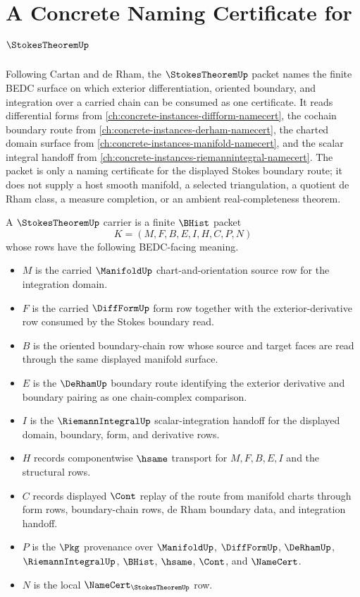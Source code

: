 \chapter{A Concrete Naming Certificate for $\StokesTheoremUp$}
\label{ch:concrete-instances-stokes-theorem-namecert}

Following Cartan and de Rham, the $\StokesTheoremUp$ packet names the finite BEDC surface on which exterior differentiation, oriented boundary, and integration over a carried chain can be consumed as one certificate. It reads differential forms from \autoref{ch:concrete-instances-diffform-namecert}, the cochain boundary route from \autoref{ch:concrete-instances-derham-namecert}, the charted domain surface from \autoref{ch:concrete-instances-manifold-namecert}, and the scalar integral handoff from \autoref{ch:concrete-instances-riemannintegral-namecert}. The packet is only a naming certificate for the displayed Stokes boundary route; it does not supply a host smooth manifold, a selected triangulation, a quotient de Rham class, a measure completion, or an ambient real-completeness theorem.

\begin{definition}\label{def:stokes-theorem-carrier}
A $\StokesTheoremUp$ carrier is a finite $\BHist$ packet
$$
K=(M,F,B,E,I,H,C,P,N)
$$
whose rows have the following BEDC-facing meaning.
\begin{itemize}
\item $M$ is the carried $\ManifoldUp$ chart-and-orientation source row for the integration domain.
\item $F$ is the carried $\DiffFormUp$ form row together with the exterior-derivative row consumed by the Stokes boundary read.
\item $B$ is the oriented boundary-chain row whose source and target faces are read through the same displayed manifold surface.
\item $E$ is the $\DeRhamUp$ boundary route identifying the exterior derivative and boundary pairing as one chain-complex comparison.
\item $I$ is the $\RiemannIntegralUp$ scalar-integration handoff for the displayed domain, boundary, form, and derivative rows.
\item $H$ records componentwise $\hsame$ transport for $M,F,B,E,I$ and the structural rows.
\item $C$ records displayed $\Cont$ replay of the route from manifold charts through form rows, boundary-chain rows, de Rham boundary data, and integration handoff.
\item $P$ is the $\Pkg$ provenance over $\ManifoldUp$, $\DiffFormUp$, $\DeRhamUp$, $\RiemannIntegralUp$, $\BHist$, $\hsame$, $\Cont$, and $\NameCert$.
\item $N$ is the local $\NameCert_{\StokesTheoremUp}$ row.
\end{itemize}
\end{definition}

